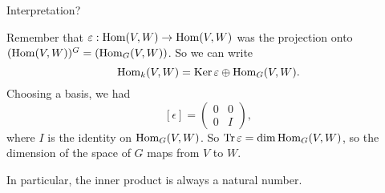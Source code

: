 Interpretation?

Remember that $\varepsilon: \operatorname{Hom}(V, W) \to  \operatorname{Hom}(V, W)$ was the projection onto $(\operatorname{Hom}(V, W))^{G} = (\operatorname{Hom}_{G}(V, W))$.
So we can write
\[
\operatorname{Hom}_{k}(V, W) = \operatorname{Ker} \varepsilon \oplus \operatorname{Hom}_{G}(V, W)
.\] 
Choosing a basis, we had
\[
    [\epsilon] =  \begin{pmatrix}
        0 & 0 \\
        0 & I
    \end{pmatrix}
,\] 
where $I$ is the identity on  $ \operatorname{Hom}_{G}(V, W)$.
So $\operatorname{Tr} \varepsilon = \dim \operatorname{Hom}_{G}(V, W)$, so the dimension of the space of $G$ maps from $V$ to $W$.

In particular, the inner product is always a natural number.
